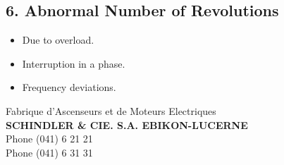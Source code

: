 \subsection*{6. Abnormal Number of Revolutions}
\begin{itemize}
    \item Due to overload.
    \item Interruption in a phase.
    \item Frequency deviations.
\end{itemize}

\begin{flushright}
    Fabrique d'Ascenseurs et de Moteurs Electriques\\
    \textbf{SCHINDLER \& CIE. S.A. EBIKON-LUCERNE}\\
    Phone (041) 6 21 21\\
    Phone (041) 6 31 31
\end{flushright}
